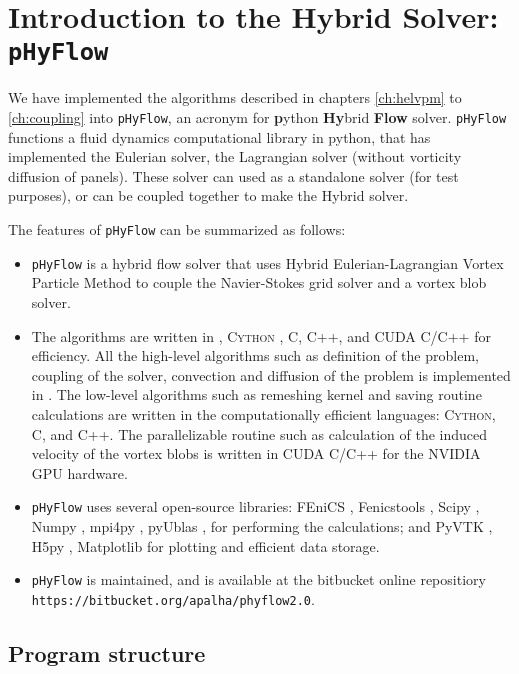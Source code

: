 \chapter{Introduction to the Hybrid Solver: \texttt{pHyFlow}}

We have implemented the algorithms described in chapters \ref{ch:helvpm} to \ref{ch:coupling} into \texttt{pHyFlow}, an acronym for \textbf{p}ython \textbf{Hy}brid \textbf{Flow} solver. \texttt{pHyFlow} functions a fluid dynamics computational library in python, that has implemented the Eulerian solver, the Lagrangian solver (without vorticity diffusion of panels). These solver can used as a standalone solver (for test purposes), or can be coupled together to make the Hybrid solver. 


The features of \texttt{pHyFlow} can be summarized as follows:
\begin{itemize}
\item \texttt{pHyFlow} is a hybrid flow solver that uses Hybrid Eulerian-Lagrangian Vortex Particle Method to couple the Navier-Stokes grid solver and a vortex blob solver.
\item The algorithms are written in \python, \textsc{Cython} \cite{Behnel2011}, C, C++, and CUDA C/C++ for efficiency. All the high-level algorithms such as definition of the problem, coupling of the solver, convection and diffusion of the problem is implemented in \python. The low-level algorithms such as remeshing kernel and saving routine calculations are written in the computationally efficient languages: \textsc{Cython}, C, and C++. The parallelizable routine such as calculation of the induced velocity of the vortex blobs is written in CUDA C/C++ for the NVIDIA GPU hardware.
\item \texttt{pHyFlow} uses several open-source libraries: FEniCS \cite{Logg2012b}, Fenicstools \cite{fenicstools}, Scipy \cite{scipyLibrary}, Numpy \cite{VanDerWalt2011}, mpi4py \cite{Dalcin2008}, pyUblas \cite{pyublasLink}, for performing the calculations; and PyVTK \cite{pyublasLink}, H5py \cite{collette2013python}, Matplotlib \cite{Hunter:2007} for plotting and efficient data storage.
\item \texttt{pHyFlow} is maintained, and is available at the bitbucket online repositiory\\ \texttt{https://bitbucket.org/apalha/phyflow2.0}.
\end{itemize}


\section{Program structure}

